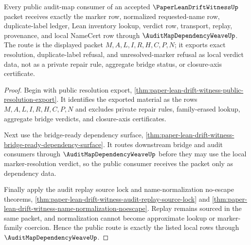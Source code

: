 \begin{theorem}
\label{thm:paper-lean-drift-witness-public-export-route}
Every public audit-map consumer of an accepted $\PaperLeanDriftWitnessUp$ packet receives exactly the marker row, normalized requested-name row, duplicate-label ledger, Lean inventory lookup, verdict row, transport, replay, provenance, and local NameCert row through $\AuditMapDependencyWeaveUp$. The route is the displayed packet $M,A,L,I,R,H,C,P,N$; it exports exact resolution, duplicate-label refusal, and unresolved-marker refusal as local verdict data, not as a private repair rule, aggregate bridge status, or closure-axis certificate.
\end{theorem}
\begin{proof}
Begin with public resolution export, \autoref{thm:paper-lean-drift-witness-public-resolution-export}. It identifies the exported material as the rows $M,A,L,I,R,H,C,P,N$ and excludes private repair rules, family-erased lookup, aggregate bridge verdicts, and closure-axis certificates.

Next use the bridge-ready dependency surface, \autoref{thm:paper-lean-drift-witness-bridge-ready-dependency-surface}. It routes downstream bridge and audit consumers through $\AuditMapDependencyWeaveUp$ before they may use the local marker-resolution verdict, so the public consumer receives the packet only as dependency data.

Finally apply the audit replay source lock and name-normalization no-escape theorems, \autoref{thm:paper-lean-drift-witness-audit-replay-source-lock} and \autoref{thm:paper-lean-drift-witness-name-normalization-noescape}. Replay remains sourced in the same packet, and normalization cannot become approximate lookup or marker-family coercion. Hence the public route is exactly the listed local rows through $\AuditMapDependencyWeaveUp$.
\end{proof}


